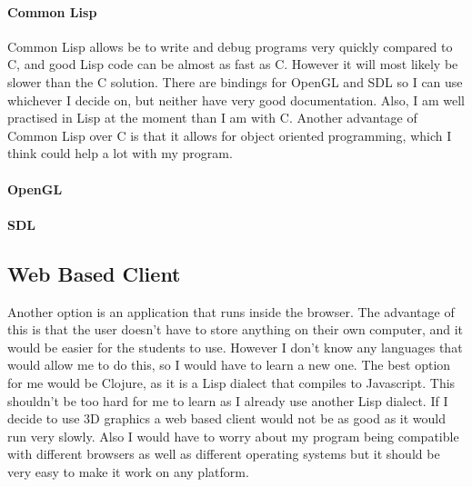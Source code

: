 \paragraph{Common Lisp} 
Common Lisp allows be to write and debug programs very quickly compared to C,
and good Lisp code can be almost as fast as C. However it will most likely be
slower than the C solution. There are bindings for OpenGL and SDL so I can use
whichever I decide on, but neither have very good documentation. Also, I am well
practised in Lisp at the moment than I am with C. Another advantage of Common
Lisp over C is that it allows for object oriented programming, which I think
could help a lot with my program.

\paragraph{OpenGL}

\paragraph{SDL}

\subsection{Web Based Client}
Another option is an application that runs inside the browser. The advantage of
this is that the user doesn't have to store anything on their own computer, and
it would be easier for the students to use. However I don't know any languages
that would allow me to do this, so I would have to learn a new one. The best
option for me would be Clojure, as it is a Lisp dialect that compiles to
Javascript. This shouldn't be too hard for me to learn as I already use another
Lisp dialect. If I decide to use 3D graphics a web based client would not be as
good as it would run very slowly. Also I would have to worry about my program
being compatible with different browsers as well as different operating systems
but it should be very easy to make it work on any platform. 
